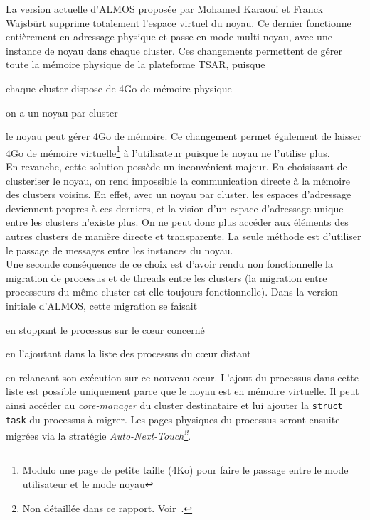     La version actuelle d'ALMOS proposée par Mohamed Karaoui et Franck Wajsbürt
    supprime totalement l'espace virtuel du noyau. Ce dernier fonctionne
    entièrement en adressage physique et passe en mode multi-noyau, avec une
    instance de noyau dans chaque cluster. Ces changements permettent de gérer
    toute la mémoire physique de la plateforme TSAR, puisque \benumline \item
    chaque cluster dispose de 4Go de mémoire physique \item on a un noyau par
    cluster \item le noyau peut gérer 4Go de mémoire\eenumline. Ce changement
    permet également de laisser 4Go de mémoire virtuelle\footnote{Modulo une
      page de petite taille (4Ko) pour faire le passage entre le mode
      utilisateur et le mode noyau} à l'utilisateur puisque le noyau ne
    l'utilise plus.\\

    En revanche, cette solution possède un inconvénient majeur. En choisissant
    de clusteriser le noyau, on rend impossible la communication directe à la
    mémoire des clusters voisins. En effet, avec un noyau par cluster, les
    espaces d'adressage deviennent propres à ces derniers, et la vision d'un
    espace d'adressage unique entre les clusters n'existe plus. On ne peut donc
    plus accéder aux éléments des autres clusters de manière directe et
    transparente. La seule méthode est d'utiliser le passage de messages entre
    les instances du noyau.\\

    Une seconde conséquence de ce choix est d'avoir rendu non fonctionnelle la
    migration de processus et de threads entre les clusters (la migration entre
    processeurs du même cluster est elle toujours fonctionnelle). Dans la
    version initiale d'ALMOS, cette migration se faisait\benumline \item en
    stoppant le processus sur le c\oe ur concerné \item en l'ajoutant dans la
    liste des processus du c\oe ur distant \item en relancant son exécution sur
    ce nouveau c\oe ur\eenumline. L'ajout du processus dans cette liste est
    possible uniquement parce que le noyau est en mémoire virtuelle. Il peut
    ainsi accéder au \textit{core-manager} du cluster destinataire et lui
    ajouter la \texttt{struct task} du processus à migrer. Les pages physiques
    du processus seront ensuite migrées via la stratégie
    \textit{Auto-Next-Touch\footnote{Non détaillée dans ce
        rapport. Voir~\citep{almaless2014universite}.}}.


